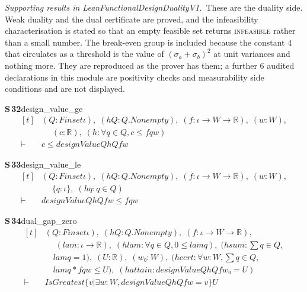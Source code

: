 \documentclass[conference]{IEEEtran}
\theoremstyle{definition}
\newcommand{\lean}[1]{\textsf{\footnotesize #1}}
\begin{document}
\noindent\emph{Supporting results in \lean{LeanFunctionalDesignDualityV1}.}~These are the duality side. Weak duality and the dual certificate are proved, and the infeasibility characterisation is stated so that an empty feasible set returns \textsc{infeasible} rather than a small number. The break-even group is included because the constant $4$ that circulates as a threshold is the value of $(\sigma_{a}+\sigma_{b})^{2}$ at unit variances and nothing more. They are reproduced as the prover has them; a further $6$ audited declarations in this module are positivity checks and measurability side conditions and are not displayed.

\noindent\textbf{S\,32}\quad\lean{design\_value\_ge}
{\footnotesize\[ \begin{aligned}[t]
&(\mathit{Q} : \mathit{Finset} \iota ),\; (\mathit{hQ} : \mathit{Q}.\mathit{Nonempty}),\; (\mathit{f} : \iota \to \mathit{W} \to \mathbb{R} ),\; (\mathit{w} : \mathit{W}),\\
&\quad \; (\mathit{c} : \mathbb{R} ),\; (\mathit{h} : \forall \mathit{q} \in \mathit{Q}, \mathit{c} \leq \mathit{f} \mathit{q} \mathit{w})\\
\vdash\;&\mathit{c} \leq \mathit{designValue} \mathit{Q} \mathit{hQ} \mathit{f} \mathit{w}
\end{aligned} \]}

\noindent\textbf{S\,33}\quad\lean{design\_value\_le}
{\footnotesize\[ \begin{aligned}[t]
&(\mathit{Q} : \mathit{Finset} \iota ),\; (\mathit{hQ} : \mathit{Q}.\mathit{Nonempty}),\; (\mathit{f} : \iota \to \mathit{W} \to \mathbb{R} ),\; (\mathit{w} : \mathit{W}),\\
&\quad \; \{ \mathit{q} : \iota \},\; (\mathit{hq} : \mathit{q} \in \mathit{Q})\\
\vdash\;&\mathit{designValue} \mathit{Q} \mathit{hQ} \mathit{f} \mathit{w} \leq \mathit{f} \mathit{q} \mathit{w}
\end{aligned} \]}

\noindent\textbf{S\,34}\quad\lean{dual\_gap\_zero}
{\footnotesize\[ \begin{aligned}[t]
&(\mathit{Q} : \mathit{Finset} \iota ),\; (\mathit{hQ} : \mathit{Q}.\mathit{Nonempty}),\; (\mathit{f} : \iota \to \mathit{W} \to \mathbb{R} ),\\
&\quad \; (\mathit{lam} : \iota \to \mathbb{R} ),\; (\mathit{hlam} : \forall \mathit{q} \in \mathit{Q}, 0 \leq \mathit{lam} \mathit{q}),\; (\mathit{hsum} : \textstyle\sum \mathit{q} \in \mathit{Q},\\
&\quad \mathit{lam} \mathit{q} = 1),\; (\mathit{U} : \mathbb{R} ),\; (\mathit{w₀} : \mathit{W}),\; (\mathit{hcert} : \forall \mathit{w} : \mathit{W}, \textstyle\sum \mathit{q} \in \mathit{Q},\\
&\quad \mathit{lam} \mathit{q} * \mathit{f} \mathit{q} \mathit{w} \leq \mathit{U}),\; (\mathit{hattain} : \mathit{designValue} \mathit{Q} \mathit{hQ} \mathit{f} \mathit{w₀} = \mathit{U})\\
\vdash\;&\mathit{IsGreatest} \{ \mathit{v} | \exists \mathit{w} : \mathit{W}, \mathit{designValue} \mathit{Q} \mathit{hQ} \mathit{f} \mathit{w} = \mathit{v}\} \mathit{U}
\end{aligned} \]}
\end{document}
